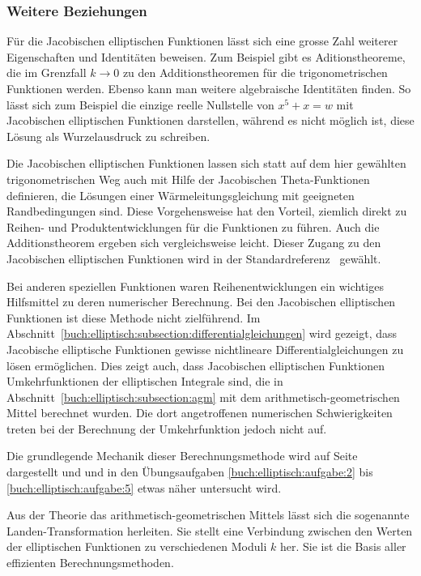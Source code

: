 \subsubsection{Weitere Beziehungen}
Für die Jacobischen elliptischen Funktionen lässt sich eine grosse
Zahl weiterer Eigenschaften und Identitäten beweisen.
Zum Beispiel gibt es Aditionstheoreme, die im Grenzfall $k\to 0$ zu
den Additionstheoremen für die trigonometrischen Funktionen werden.
%
Ebenso kann man weitere algebraische Identitäten finden.
So lässt sich zum Beispiel die einzige reelle Nullstelle von $x^5+x=w$
mit Jacobischen elliptischen Funktionen darstellen, während es
nicht möglich ist, diese Lösung als Wurzelausdruck zu schreiben.

Die Jacobischen elliptischen Funktionen lassen sich statt auf dem
hier gewählten trigonometrischen Weg auch mit Hilfe der Jacobischen
Theta-Funktionen definieren, die Lösungen einer Wärmeleitungsgleichung
%
%
mit geeigneten Randbedingungen sind.
Diese Vorgehensweise hat den Vorteil, ziemlich direkt zu
Reihen- und Produktentwicklungen für die Funktionen zu führen.
Auch die Additionstheorem ergeben sich vergleichsweise leicht.
Dieser Zugang zu den Jacobischen elliptischen Funktionen wird in der
Standardreferenz~\cite{buch:ellfun-applications} gewählt.

Bei anderen speziellen Funktionen waren Reihenentwicklungen ein
wichtiges Hilfsmittel zu deren numerischer Berechnung.
Bei den Jacobischen elliptischen Funktionen ist diese Methode
nicht zielführend.
Im Abschnitt~\ref{buch:elliptisch:subsection:differentialgleichungen}
wird gezeigt, dass Jacobische elliptische Funktionen gewisse nichtlineare
Differentialgleichungen zu lösen ermöglichen.
Dies zeigt auch, dass Jacobischen elliptischen Funktionen
Umkehrfunktionen der elliptischen Integrale sind, die in
Abschnitt~\ref{buch:elliptisch:subsection:agm} mit dem
arithmetisch-geometrischen Mittel berechnet wurden.
Die dort angetroffenen numerischen Schwierigkeiten treten bei der
Berechnung der Umkehrfunktion jedoch nicht auf.

Die grundlegende Mechanik dieser Berechnungsmethode wird auf
Seite~\pageref{buch:elliptisch:jacobi:agm} dargestellt und
und in den Übungsaufgaben
\ref{buch:elliptisch:aufgabe:2} bis \ref{buch:elliptisch:aufgabe:5}
etwas näher untersucht wird.

Aus der Theorie das arithmetisch-geometrischen Mittels lässt sich
die sogenannte Landen-Trans\-formation herleiten.
%
Sie stellt eine Verbindung zwischen
den Werten der elliptischen Funktionen zu verschiedenen Moduli $k$ her.
Sie ist die Basis aller effizienten Berechnungsmethoden.




